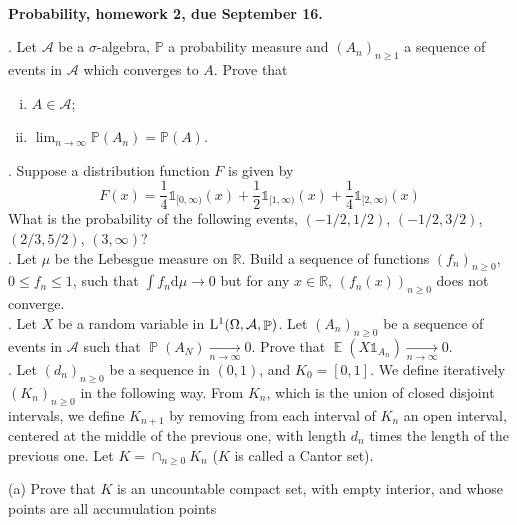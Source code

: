 \documentclass[11pt,reqno]{amsart}
\newcommand{\RR}{{\mathbb R}}
\DeclareMathOperator{\Prob}{\mathbb{P}}   %
\DeclareMathOperator{\E}{\mathbb{E}}      %
\theoremstyle{definition}
\theoremstyle{remark}
\newcommand{\rd}{{\mathrm{d}}}            %
\newcommand{\1}{\mathds{1}}
\numberwithin{equation}{section}
\begin{document}
~\vspace{-3.5cm}
\begin{center}
{\bf Probability, homework 2, due September 16.}
\end{center}
\vspace{0.2cm}
\small

. 
Let $\mathcal{A}$ be a $\sigma$-algebra, $\mathbb{P}$ a probability measure and $(A_n)_{n\geq 1}$ a sequence of events in $\mathcal{A}$ which converges to $A$. Prove that
\begin{enumerate}[(i)]
\item $A\in\mathcal{A}$;
\item  $\lim_{n\to\infty}\mathbb{P}(A_n)=\mathbb{P}(A)$.\\
\end{enumerate}

. Suppose a distribution function $F$ is given by
$$
F(x)=\frac{1}{4}\mathds{1}_{[0,\infty)}(x)
+\frac{1}{2}\mathds{1}_{[1,\infty)}(x)
+\frac{1}{4}\mathds{1}_{[2,\infty)}(x)
$$
What is the probability of the following events, $(-1/2,1/2)$, $(-1/2,3/2)$, $(2/3,5/2)$, $(3,\infty)$? 
\\



.  Let $\mu$ be the Lebesgue measure on $\mathbb{R}$.
Build a sequence of functions $(f_n)_{n\geq 0}$, $0\leq f_n\leq 1$, such that $\int f_n\rd \mu\to 0$ but
for any $x\in\RR$, $(f_n(x))_{n\geq 0}$ does not converge.\\




. Let $X$ be a random variable in ${\rm L}^1(\Omega,\mathcal{A},\Prob)$.
Let $(A_n)_{n\geq 0}$ be a sequence of events in $\mathcal{A}$ such that $\Prob(A_N)\underset{n\to\infty}{\longrightarrow}0$. Prove that $\E(X\1_{A_n})\underset{n\to\infty}{\longrightarrow}0$.\\


.
Let $(d_n)_{n\geq 0}$ be a sequence in $(0,1)$, and $K_0=[0,1]$. We define iteratively $(K_n)_{n\geq 0}$
in the following way. From $K_n$, which is the union of closed disjoint intervals, we define $K_{n+1}$
by removing from each interval of $K_n$ an open interval, centered at the middle of the previous one, with length
$d_n$ times the length of the previous one. Let $K=\cap_{n\geq 0}K_n$ ($K$ is called a Cantor set).

(a) Prove that $K$ is an uncountable compact set, with empty interior, and whose points are all accumulation points
\end{document}
